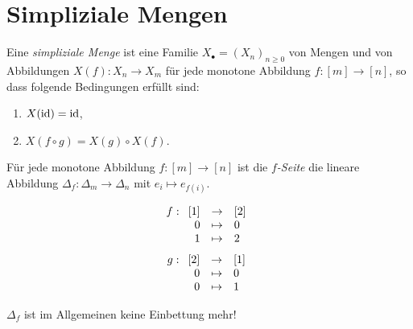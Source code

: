 \section{Simpliziale Mengen}

\begin{definition}
  Eine \emph{simpliziale Menge} ist eine Familie $X_\bullet = (X_n)_{n\geq
  0}$ von Mengen und von Abbildungen $X(f):X_n \to X_m$ für jede monotone
  Abbildung $f:[m]\to [n]$, so dass folgende Bedingungen erfüllt sind:
  \begin{enumerate}
    \item $X(\operatorname{id}) = \operatorname{id}$, 
    \item $X(f\circ g) = X(g)\circ X(f)$.
  \end{enumerate}
  Für jede monotone Abbildung $f:[m]\to [n]$ ist die \emph{$f$-Seite} die
  lineare Abbildung $\Delta_f: \Delta_m\to\Delta_n$ mit $e_i\mapsto e_{f(i)}$.
\end{definition}


\begin{beispiel}
  \makebox{}
  \begin{center}
  \quad\begin{minipage}[b]{0.3\textwidth}
    \[ f: \funcdef{ [1] &\to& [2] \\ 0&\mapsto & 0\\ 1&\mapsto & 2}\]
    \[ g: \funcdef{ [2] &\to& [1] \\ 0&\mapsto & 0\\ 0&\mapsto & 1}\]
    \end{minipage}
  \end{center}
\end{beispiel}

\begin{bemerkung}
  $\Delta_f$ ist im Allgemeinen keine Einbettung mehr!
\end{bemerkung}

